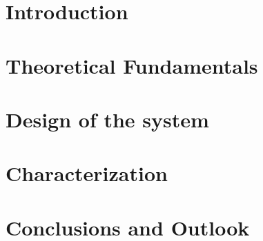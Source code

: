 \documentclass[dvipsnames,table]{include/thesisclass}
\begin{document}
    \FrontMatter
    
	\tikzexternaldisable
    
    \tikzexternalenable
    
    
    
	
    \begingroup   %
    \tableofcontents                    %
    \listoffigures
    \listoftables
    \endgroup
    \cleardoublepage

	

    \MainMatter
    \chapter{Introduction}
    		
    \chapter{Theoretical Fundamentals}
    		
	\chapter{Design of the system}
		
	\chapter{Characterization}	
		
    \chapter{Conclusions and Outlook}
    		

    \Appendix
    \chapter*{\appendixname} 



    \TheBibliography
    \nocite{*}
    
    


\end{document}
